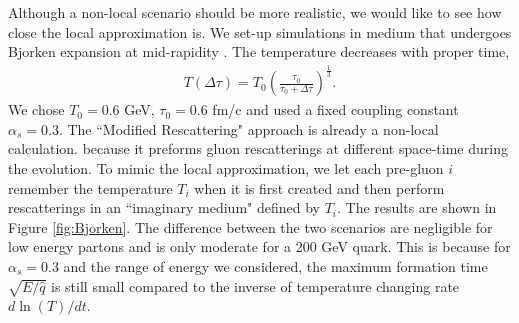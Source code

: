 \documentclass[aps, prc, reprint, amsmath, groupedaddress, nofootinbib]{revtex4-1}
\begin{document}
Although a non-local scenario should be more realistic, we would like to see how close the local approximation is.
We set-up simulations in medium that undergoes Bjorken expansion at mid-rapidity \cite{PhysRevD.27.140}. 
The temperature decreases with proper time,
\begin{eqnarray}
T(\Delta\tau) = T_0 \left(\frac{\tau_0}{\tau_0+\Delta\tau}\right)^{\frac{1}{3}}.
\end{eqnarray}
We chose $T_0=0.6$ GeV, $\tau_0=0.6$ fm/c and used a fixed coupling constant $\alpha_s = 0.3$.
The ``Modified Rescattering" approach is already a non-local calculation. because it preforms gluon rescatterings at different space-time during the evolution. 
To mimic the local approximation, we let each pre-gluon $i$ remember the temperature $T_i$ when it is first created and then perform rescatterings in an ``imaginary medium" defined by $T_i$.
The results are shown in Figure \ref{fig:Bjorken}. 
The difference between the two scenarios are negligible for low energy partons and is only moderate for a 200 GeV quark.
This is because for $\alpha_s = 0.3$ and the range of energy we considered, the maximum formation time $\sqrt{E/\hat{q}}$ is still small compared to the inverse of temperature changing rate $d\ln(T)/dt$.
\end{document}
